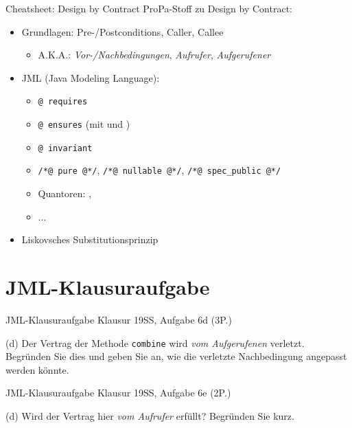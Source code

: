 \documentclass{beamer}
\begin{document}
\begin{frame}{Cheatsheet: Design by Contract}
	ProPa-Stoff zu Design by Contract:

	\begin{itemize}
		\item Grundlagen: Pre-/Postconditions, Caller, Callee
		\begin{itemize}
                  \item A.K.A.: \emph{Vor-/Nachbedingungen}, \emph{Aufrufer}, \emph{Aufgerufener}
		\end{itemize}
		\item JML (Java Modeling Language):
		\begin{itemize}
			\item \texttt{@ requires}
			\item \texttt{@ ensures} (mit \texttt{\string\old} und \texttt{\string\result})
			\item \texttt{@ invariant}
			\item \texttt{/*@ pure @*/}, \texttt{/*@ nullable @*/}, \texttt{/*@ spec\_public @*/}
			\item Quantoren: \texttt{\string\forall}, \texttt{\string\exists}
			\item ...
		\end{itemize}
		\item Liskovsches Substitutionsprinzip
	\end{itemize}
\end{frame}

\section{JML-Klausuraufgabe}

\begin{frame}{JML-Klausuraufgabe}
    Klausur 19SS, Aufgabe 6d (3P.)

    {
    \footnotesize

    (d) Der Vertrag der Methode \texttt{combine} wird \emph{vom Aufgerufenen} verletzt.
    Begründen Sie dies und geben Sie an, wie die verletzte Nachbedingung angepasst werden könnte.
    }
\end{frame}

\begin{frame}{JML-Klausuraufgabe}
    Klausur 19SS, Aufgabe 6e (2P.)

    {
    \footnotesize

    (d) Wird der Vertrag hier \emph{vom Aufrufer} erfüllt?
    Begründen Sie kurz.
    }
\end{frame}
\end{document}
